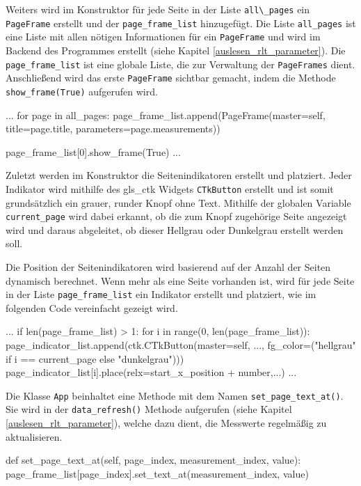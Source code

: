 Weiters wird im Konstruktor für jede Seite in der Liste \lstinline{all\_pages} ein \lstinline{PageFrame} erstellt und der \lstinline{page_frame_list} hinzugefügt. Die Liste \lstinline{all_pages} ist eine Liste mit allen nötigen Informationen für ein \lstinline{PageFrame} und wird im Backend des Programmes erstellt (siehe Kapitel \ref{auslesen_rlt_parameter}). Die \lstinline{page_frame_list} ist eine globale Liste, die zur Verwaltung der \lstinline{PageFrames} dient. Anschließend wird das erste \lstinline{PageFrame} sichtbar gemacht, indem die Methode \lstinline{show_frame(True)} aufgerufen wird.

\begin{pythoncode}
...	
		for page in all_pages:
			page_frame_list.append(PageFrame(master=self, title=page.title, parameters=page.measurements))
   
		page_frame_list[0].show_frame(True)
...
\end{pythoncode}

Zuletzt werden im Konstruktor die Seitenindikatoren erstellt und platziert. Jeder Indikator wird mithilfe des \gls{gls_ctk} Widgets \lstinline{CTkButton} erstellt und ist somit grundsätzlich ein grauer, runder Knopf ohne Text. Mithilfe der globalen Variable \lstinline{current_page} wird dabei erkannt, ob die zum Knopf zugehörige Seite angezeigt wird und daraus abgeleitet, ob dieser Hellgrau oder Dunkelgrau erstellt werden soll.

Die Position der Seitenindikatoren wird basierend auf der Anzahl der Seiten dynamisch berechnet. Wenn mehr als eine Seite vorhanden ist, wird für jede Seite in der Liste \lstinline{page_frame_list} ein Indikator erstellt und platziert, wie im folgenden Code vereinfacht gezeigt wird.

\begin{pythoncode}
...
		if len(page_frame_list) > 1:
			for i in range(0, len(page_frame_list)):
				page_indicator_list.append(ctk.CTkButton(master=self, ..., fg_color=("hellgrau" if i == current_page else "dunkelgrau")))
				page_indicator_list[i].place(relx=start_x_position + number,...)
...
\end{pythoncode}

Die Klasse \lstinline{App} beinhaltet eine Methode mit dem Namen \lstinline{set_page_text_at()}. Sie wird in der \lstinline{data_refresh()} Methode aufgerufen (siehe Kapitel \ref{auslesen_rlt_parameter}), welche dazu dient, die Messwerte regelmäßig zu aktualisieren.

\begin{pythoncode}
	def set_page_text_at(self, page_index, measurement_index, value):
    	page_frame_list[page_index].set_text_at(measurement_index, value)
\end{pythoncode}

